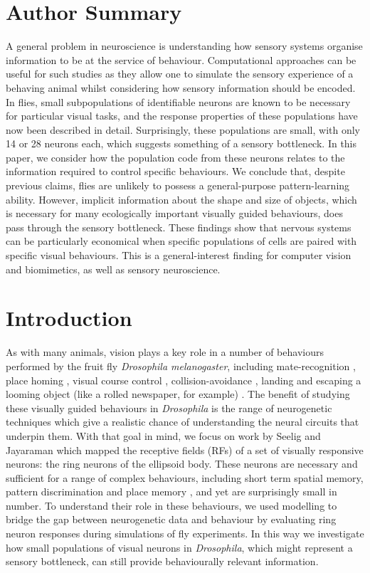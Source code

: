 \section*{Author Summary}
A general problem in neuroscience is understanding how sensory systems organise information to be at the service of behaviour. Computational approaches can be useful for such studies as they allow one to simulate the sensory experience of a behaving animal whilst considering how sensory information should be encoded. In flies, small subpopulations of identifiable neurons are known to be necessary for particular visual tasks, and the response properties of these populations have now been described in detail. Surprisingly, these populations are small, with only 14 or 28 neurons each, which suggests something of a sensory bottleneck. In this paper, we consider how the population code from these neurons relates to the information required to control specific behaviours. We conclude that, despite previous claims, flies are unlikely to possess a general-purpose pattern-learning ability. However, implicit information about the shape and size of objects, which is necessary for many ecologically important visually guided behaviours, does pass through the sensory bottleneck. These findings show that nervous systems can be particularly economical when specific populations of cells are paired with specific visual behaviours. This is a general-interest finding for computer vision and biomimetics, as well as sensory neuroscience.

\section*{Introduction}
As with many animals, vision plays a key role in a number of behaviours performed by the fruit fly \emph{Drosophila melanogaster}, including mate-recognition \cite{Agrawal2014}, place homing \cite{Ofstad2011}, visual course control \cite{Borst2014}, collision-avoidance \cite{Tammero2002}, landing \cite{Tammero2002} and escaping a looming object (like a rolled newspaper, for example) \cite{Card2008}. The benefit of studying these visually guided behaviours in \emph{Drosophila} is the range of neurogenetic techniques which give a realistic chance of understanding the neural circuits that underpin them. With that goal in mind, we focus on work by Seelig and Jayaraman \cite{Seelig2013} which mapped the receptive fields (RFs) of a set of visually responsive neurons: the ring neurons of the ellipsoid body. These neurons are necessary and sufficient for a range of complex behaviours, including short term spatial memory, pattern discrimination and place memory \cite{Liu2006,Neuser2008,Ofstad2011,Seelig2015}, and yet are surprisingly small in number. To understand their role in these behaviours, we used modelling to bridge the gap between neurogenetic data and behaviour by evaluating ring neuron responses during simulations of fly experiments. In this way we investigate how small populations of visual neurons in \emph{Drosophila}, which might represent a sensory bottleneck, can still provide behaviourally relevant information.

